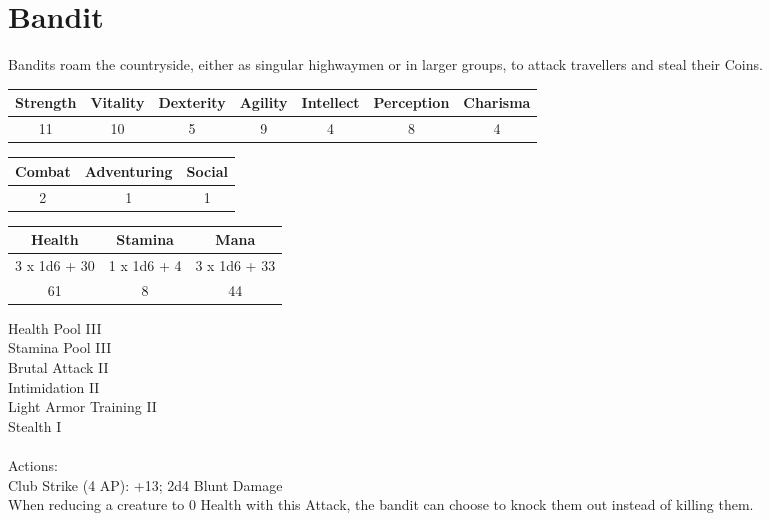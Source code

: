 \section{Bandit}

Bandits roam the countryside, either as singular highwaymen or in larger groups, to attack travellers and steal their Coins.

\begin{minipage}[H]{1\textwidth}
	\centering
	\begin{tabular}[c]{|c | c | c | c | c | c | c|}
		\hline
		Strength & Vitality & Dexterity & Agility & Intellect & Perception & Charisma\\
		\hline
		11 & 10 & 5 & 9 & 4 & 8 & 4\\
		\hline
	\end{tabular}
\end{minipage}
\bigbreak
\begin{minipage}[H]{1\textwidth}
	\centering
	\begin{tabular}[c]{|c | c | c|}
		\hline
		Combat & Adventuring & Social\\
		\hline
		2 & 1 & 1\\
		\hline
	\end{tabular}
\end{minipage}
\bigbreak
\begin{minipage}[H]{1\textwidth}
	\centering
	\begin{tabular}[c]{|c | c | c|}
		\hline
		Health & Stamina & Mana\\
		\hline
		3 x 1d6 + 30 & 1 x 1d6 + 4 & 3 x 1d6 + 33\\
		61 & 8 & 44\\
		\hline
	\end{tabular}
\end{minipage}
\noindent
Health Pool III\\
Stamina Pool III\\
Brutal Attack II\\
Intimidation II\\
Light Armor Training II\\
Stealth I\\
\\
Actions:\\
Club Strike (4 AP): +13; 2d4 Blunt Damage\\
When reducing a creature to 0 Health with this Attack, the bandit can choose to knock them out instead of killing them.\\
